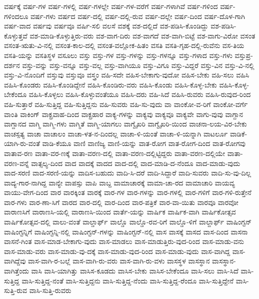 {ವರ್ಷಕ್ಕೆ
ವರ್ಷ-ಗಳ
ವರ್ಷ-ಗಳಲ್ಲಿ
ವರ್ಷ-ಗಳಲ್ಲೇ
ವರ್ಷ-ಗಳ-ವರೆಗೆ
ವರ್ಷ-ಗಳಾಗಿವೆ
ವರ್ಷ-ಗಳಿಂದ
ವರ್ಷ-ಗಳಿಂದಲೂ
ವರ್ಷ-ಗಳು
ವರ್ಷದ
ವರ್ಷ-ದಲ್ಲಿ
ವರ್ಷ-ದಲ್ಲಿ-ರುವ
ವರ್ಷ-ದಲ್ಲೇ
ವರ್ಷ-ದಿಂದ
ವರ್ಷ-ದೊಳ-ಗಾಗಿ
ವರ್ಷ-ವಾದ
ವರ್ಷವು
ವರ್ಷವೂ
ವರ್ಷಿ-ಸಲಿ
ವಲಸೆ
ವಶಕ್ಕೆ
ವಶ-ದಲ್ಲಿದೆ
ವಶ-ಪಡಿಸಿ-ಕೊಂಡಿದ್ದು
ವಶ-ಪಡಿಸಿ-ಕೊಳ್ಳುತ್ತವೆ
ವಶ-ಮಾಡಿ-ಕೊಳ್ಳುತ್ತಿರು-ವರು
ವಶ-ವಾಗ-ದಿರು
ವಶ-ವಾಗದೆ
ವಶ-ವಾಗಿ-ಬಿಟ್ಟೆ
ವಶ-ವಾಗು-ವಿರೋ
ವಸಂತ
ವಸಂತ-ಋತು-ವಿ-ನಲ್ಲಿ
ವಸಂತ-ಕಾಲ-ದಲ್ಲಿ
ವಸಂತ-ವಲ್ಲೋಕ-ಹಿತಂ
ವಸತಿ
ವಸತಿ-ಗೃಹ-ದಲ್ಲಿ-ರುವೆನು
ವಸ-ತಿಯ
ವಸತಿ-ಯನ್ನು
ವಸತಿಸ್ಥಳ
ವಸೂಲು
ವಸ್ತು
ವಸ್ತು-ಗಳ
ವಸ್ತು-ಗಳನ್ನು
ವಸ್ತು-ಗಳನ್ನೂ
ವಸ್ತು-ಗಳಾದ
ವಸ್ತು-ಗಳು
ವಸ್ತುಪ್ರ-ದರ್ಶನ
ವಸ್ತು-ವನ್ನು
ವಸ್ತು-ವನ್ನೂ
ವಸ್ತು-ವಲ್ಲ
ವಸ್ತು-ವಾಗಿಯೂ
ವಸ್ತು-ವಿಗೂ
ವಸ್ತು-ವಿದ್ದರೆ
ವಸ್ತು-ವಿನ
ವಸ್ತು-ವಿ-ನಲ್ಲಿ
ವಸ್ತು-ವಿ-ನೊಂದಿಗೆ
ವಸ್ತುವು
ವಸ್ತುವೂ
ವಸ್ತ್ರಂ
ವಹಿ-ಸದೇ
ವಹಿಸ-ಬೇಕಾಗು-ವುದೋ
ವಹಿಸ-ಬೇಕು
ವಹಿ-ಸಲು
ವಹಿಸಿ
ವಹಿಸಿ-ಕೊಂಡರು
ವಹಿಸಿ-ಕೊಂಡಿದ್ದೇನೆ
ವಹಿಸಿ-ಕೊಂಡಿರು-ವರು
ವಹಿಸಿ-ಕೊಂಡು
ವಹಿಸಿ-ಕೊಳ್ಳ-ಬೇಕು
ವಹಿಸಿ-ಕೊಳ್ಳ-ಬೇಕೆಂದೂ
ವಹಿಸಿ-ಕೊಳ್ಳಲು
ವಹಿಸಿ-ಕೊಳ್ಳುವಂತೆಯೂ
ವಹಿಸಿ-ದರು
ವಹಿ-ಸಿದೆ
ವಹಿಸಿ-ರುವರು
ವಹಿಸಿ-ರುವುದ-ರಿಂದ
ವಹಿ-ಸುತ್ತಾರೆ
ವಹಿ-ಸುತ್ತಿದ್ದ
ವಹಿ-ಸುತ್ತಿದ್ದನು
ವಹಿ-ಸುವರು
ವಹಿ-ಸು-ವುದು
ವಾ
ವಾಂಕೋ-ವ-ರಿಗೆ
ವಾಂಕೋ-ವರ್ಗೆ
ವಾಂತಿ
ವಾಕಿಂಗ್
ವಾಕ್ಪ್ರವಾಹ-ದಿಂದ
ವಾಕ್ಪ್ರಹಾರ
ವಾಕ್ಯ-ಗಳನ್ನು
ವಾಕ್ಯವು
ವಾಕ್ಯವೂ
ವಾಕ್ಯವೇ
ವಾಗು-ವುವು
ವಾಗ್ದಾನ
ವಾಗ್ದಾನದ
ವಾಗ್ಮಿ
ವಾಗ್ಮಿ-ಗಳು
ವಾಗ್ಮಿತೆ
ವಾಗ್ಮಿ-ಯಾಗಲು
ವಾಗ್ವೈಖರಿ
ವಾಗ್ವೈಖರಿ-ಯಿಂದ
ವಾಚನಾ-ಲಯ-ವಿರ-ಬೇಕು
ವಾಚಸ್ಪತ್ಯ
ವಾಚಾ
ವಾಚಾಲಂ
ವಾಚಾ-ಳತ-ನ-ದಿಂದಲ್ಲ
ವಾಚಾ-ಳಿ-ಯಂತೆ
ವಾಚಾ-ಳಿ-ಯನ್ನಾಗಿ
ವಾಟರ್ಲೂ
ವಾಡಿಕೆ-ಯಾಗಿ-ರು-ವಂತೆ
ವಾಡಿ-ಕೆಯೂ
ವಾಣಿ
ವಾಣಿಜ್ಯ
ವಾಣಿ-ಯನ್ನು
ವಾತ-ರೋಗ
ವಾತ-ರೋಗ-ದಿಂದ
ವಾತ-ರೋಗವು
ವಾತಾವ-ರಣ
ವಾತಾ-ವರ-ಣಕ್ಕೆ
ವಾತಾ-ವರಣ-ದಲ್ಲಿ
ವಾತಾ-ವರಣ-ದಲ್ಲಿಟ್ಟಿದ್ದರು
ವಾತಾ-ವರಣ-ದಲ್ಲಿಯೇ
ವಾತಾ-ವರಣ-ವನ್ನೆ
ವಾತ್ಸಲ್ಯ-ದಿಂದ
ವಾದ
ವಾದಕ್ಕೆ
ವಾದದ
ವಾದ-ದಲ್ಲಿ
ವಾದ-ಮಾಡಿ-ದ-ನೆಂದೂ
ವಾದ-ಮಾಡು-ವುದು
ವಾದ-ಸರಣಿ
ವಾದ-ಸರಣಿ-ಯನ್ನು
ವಾದಿಸ-ಬಹುದು
ವಾದಿ-ಸಿ-ದರೆ
ವಾದಿ-ಸಿದ್ದಾರೆ
ವಾದಿ-ಸುವರು
ವಾದಿ-ಸು-ವು-ದಿಲ್ಲ
ವಾದ್ಯ-ಗಾರ-ನಾಗಿದ್ದ
ವಾನ್ಯೇ
ವಾಪಸ್ಸು
ವಾಪಿ
ವಾಬ್ದ
ವಾಮಾಚಾರಕ್ಕೆ
ವಾಮಾ-ಚಾ-ರದ
ವಾಮಾಚಾರಿ
ವಾಯವ್ಯ
ವಾಯು-ವೇಗ-ದಿಂದ
ವಾರ
ವಾರಕ್ಕಿಂತ
ವಾರಕ್ಕೆ
ವಾರ-ಗಳ
ವಾರ-ಗಳನ್ನು
ವಾರ-ಗಳಲ್ಲಿ
ವಾರ-ಗಳಿಗೆ
ವಾರ-ಗಳಿ-ರುತ್ತೇನೆ
ವಾರ-ಗಳು
ವಾರ-ಣಾ-ಸಿಗೆ
ವಾರದ
ವಾರ-ದಲ್ಲಿ
ವಾರ-ದಿಂದ
ವಾರ-ಪತ್ರಿಕೆ
ವಾರ-ವಾ-ಯಿತು
ವಾರವೂ
ವಾರವೋ
ವಾರಾಣಸಿಗೆ
ವಾರಾಣಸಿ-ಯಲ್ಲಿ
ವಾರಾಣಸಿ-ಯಿಂದ
ವಾರ್ತೆ-ಯನ್ನು
ವಾರ್ಷಿಕ
ವಾರ್ಷಿಕ-ವಾಗಿ
ವಾರ್ಷಿಕೋತ್ಸವ
ವಾರ್ಷಿಕೋತ್ಸವ-ದಲ್ಲಿ
ವಾಲು-ವಂತೆ
ವಾಲ್ಡಾರ್ಫ್
ವಾಲ್ಡೊ
ವಾಲ್ಡೊ-ರವ-ರಿಗೆ
ವಾಲ್ಡೊ-ಳಿಗೆ
ವಾಲ್ದಾರ್ಫ್
ವಾಷಿಂಗ್ಟನ್
ವಾಷಿಂಗ್ಟನ್ನಿಗೆ
ವಾಷಿಂಗ್ಟನ್ನಿ-ನಲ್ಲಿ
ವಾಷಿಂಗ್ಟನ್-ಗಳನ್ನು
ವಾಷಿಂಗ್ಟನ್-ನಲ್ಲಿ
ವಾಸ
ವಾಸಕ್ಕೆ
ವಾಸದ
ವಾಸ-ದಿಂದ
ವಾಸನಾ
ವಾಸನೆ-ಗಿಂತ
ವಾಸ-ಮಾಡ-ಬೇಕಾಗು-ವುದು
ವಾಸ-ಮಾಡಲು
ವಾಸ-ಮಾಡುತ್ತಿರು-ವುದ-ರಿಂದ
ವಾಸ-ಮಾಡು-ವನು
ವಾಸ-ಮಾಡು-ವರು
ವಾಸ-ಮಾಡು-ವು-ದಕ್ಕೆ
ವಾಸ-ಮಾಡು-ವುದ-ರಿಂದ
ವಾಸ-ಮಾಡು-ವುದು
ವಾಸ-ವಾಗಿದ್ದ
ವಾಸ-ವಾಗಿದ್ದೆವು
ವಾಸ-ವಾಗಿ-ರ-ಬಲ್ಲೆ
ವಾಸ-ವಾಗಿ-ರು-ವರು
ವಾಸ-ವಾಗಿ-ರು-ವಳು
ವಾಸಸ್ಥಳ
ವಾಸಸ್ಥಾನ
ವಾಸಸ್ಥಾನ-ವಾಗಿತ್ತೆಂದು
ವಾಸಿ
ವಾಸಿ-ಯಾಗಿತ್ತು
ವಾಸಿಸ-ಕೂಡದು
ವಾಸಿಸ-ಬೇಕು
ವಾಸಿಸ-ಬೇಕೆಂದೂ
ವಾಸಿ-ಸಲು
ವಾಸಿ-ಸಿದೆ
ವಾಸಿ-ಸುತ್ತಿದ್ದ
ವಾಸಿ-ಸುತ್ತಿದ್ದ-ನಂತೆ
ವಾಸಿ-ಸುತ್ತಿದ್ದನು
ವಾಸಿ-ಸುತ್ತಿದ್ದ-ನೆಂದು
ವಾಸಿ-ಸುತ್ತಿದ್ದ-ರೆಂದೂ
ವಾಸಿ-ಸುತ್ತಿದ್ದೇನೆ
ವಾಸಿ-ಸುತ್ತಿ-ರುವ
ವಾಸಿ-ಸುತ್ತಿ-ರುವರು
}
